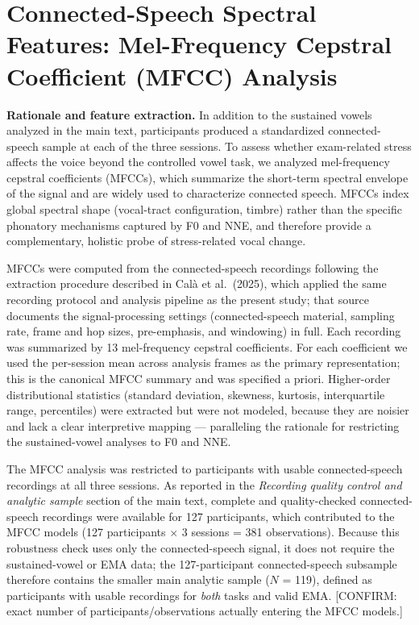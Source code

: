 \documentclass[
  english,
  man,floatsintext]{apa6}
\begin{document}
\newpage

\section{Connected-Speech Spectral Features: Mel-Frequency Cepstral Coefficient (MFCC) Analysis}\label{connected-speech-spectral-features-mel-frequency-cepstral-coefficient-mfcc-analysis}

\textbf{Rationale and feature extraction.} In addition to the sustained vowels analyzed in the main text, participants produced a standardized connected-speech sample at each of the three sessions. To assess whether exam-related stress affects the voice beyond the controlled vowel task, we analyzed mel-frequency cepstral coefficients (MFCCs), which summarize the short-term spectral envelope of the signal and are widely used to characterize connected speech. MFCCs index global spectral shape (vocal-tract configuration, timbre) rather than the specific phonatory mechanisms captured by F0 and NNE, and therefore provide a complementary, holistic probe of stress-related vocal change.

MFCCs were computed from the connected-speech recordings following the extraction procedure described in Calà et al.~(2025), which applied the same recording protocol and analysis pipeline as the present study; that source documents the signal-processing settings (connected-speech material, sampling rate, frame and hop sizes, pre-emphasis, and windowing) in full. Each recording was summarized by 13 mel-frequency cepstral coefficients. For each coefficient we used the per-session mean across analysis frames as the primary representation; this is the canonical MFCC summary and was specified a priori. Higher-order distributional statistics (standard deviation, skewness, kurtosis, interquartile range, percentiles) were extracted but were not modeled, because they are noisier and lack a clear interpretive mapping --- paralleling the rationale for restricting the sustained-vowel analyses to F0 and NNE.

The MFCC analysis was restricted to participants with usable connected-speech recordings at all three sessions. As reported in the \emph{Recording quality control and analytic sample} section of the main text, complete and quality-checked connected-speech recordings were available for 127 participants, which contributed to the MFCC models (127 participants \(\times\) 3 sessions = 381 observations). Because this robustness check uses only the connected-speech signal, it does not require the sustained-vowel or EMA data; the 127-participant connected-speech subsample therefore contains the smaller main analytic sample (\(N\) = 119), defined as participants with usable recordings for \emph{both} tasks and valid EMA. {[}CONFIRM: exact number of participants/observations actually entering the MFCC models.{]}
\end{document}
